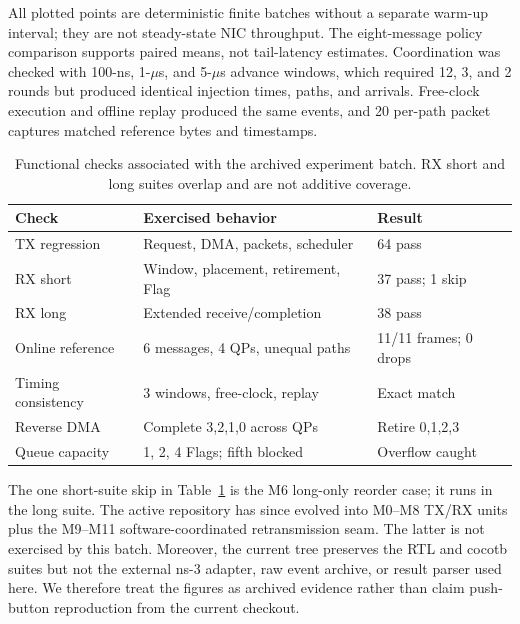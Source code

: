 All plotted points are deterministic finite batches without a separate warm-up
interval; they are not steady-state NIC throughput.  The eight-message policy
comparison supports paired means, not tail-latency estimates.  Coordination was
checked with 100-ns, 1-$\mu$s, and 5-$\mu$s advance windows, which required 12,
3, and 2 rounds but produced identical injection times, paths, and arrivals.
Free-clock execution and offline replay produced the same events, and 20
per-path packet captures matched reference bytes and timestamps.

\begin{table}[tbp]
  \centering
  \caption{Functional checks associated with the archived experiment batch.
  RX short and long suites overlap and are not additive coverage.}
  \label{tab:eval:validation}
  \scriptsize
  \begin{tabular}{@{}p{}p{}p{}@{}}
    \toprule
    Check & Exercised behavior & Result \\
    \midrule
    TX regression & Request, DMA, packets, scheduler & 64 pass \\
    RX short & Window, placement, retirement, Flag & 37 pass; 1 skip \\
    RX long & Extended receive/completion & 38 pass \\
    Online reference & 6 messages, 4 QPs, unequal paths & 11/11 frames; 0 drops \\
    Timing consistency & 3 windows, free-clock, replay & Exact match \\
    Reverse DMA & Complete 3,2,1,0 across QPs & Retire 0,1,2,3 \\
    Queue capacity & 1, 2, 4 Flags; fifth blocked & Overflow caught \\
    \bottomrule
  \end{tabular}
\end{table}

The one short-suite skip in Table~\ref{tab:eval:validation} is the M6
long-only reorder case; it runs in the long suite.  The active repository has
since evolved into M0--M8 TX/RX units plus the M9--M11 software-coordinated
retransmission seam.  The latter is not exercised by this batch.  Moreover, the
current tree preserves the RTL and cocotb suites but not the external ns-3
adapter, raw event archive, or result parser used here.  We therefore treat the
figures as archived evidence rather than claim push-button reproduction from
the current checkout.


